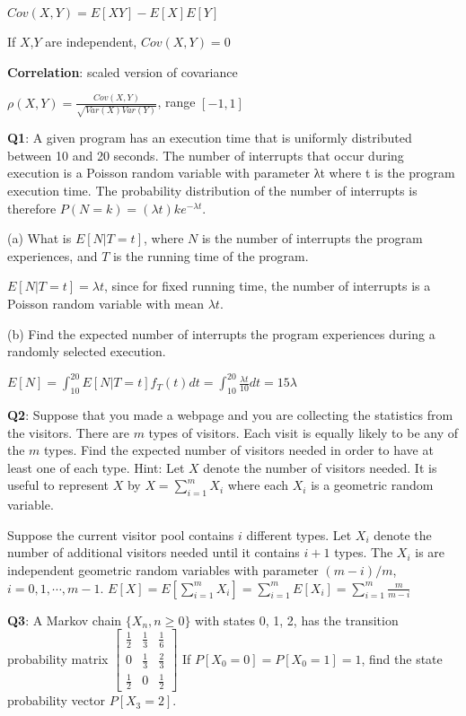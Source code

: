 \documentclass[10pt]{article}
\begin{document}
\begin{multicols*}{3}
$Cov(X,Y) = E[XY] - E[X]E[Y]$

If $X$,$Y$ are independent, $Cov(X,Y)=0$



{\bf Correlation}: scaled version of covariance

$\rho(X,Y)=\frac{Cov(X,Y)}{\sqrt{Var(X)Var(Y)}}$, range $[-1,1]$



{\bf Q1}: A given program has an execution time that is uniformly distributed between 10 and 20 seconds. The number of interrupts that occur during execution is a Poisson random variable with parameter λt where t is the program execution time. The probability distribution of the number of interrupts is therefore $P(N = k) = (\lambda t)ke^{−\lambda t}$.

(a) What is $E[N|T = t]$, where $N$ is the number of interrupts the program experiences, and $T$ is the running time of the program.

$E[N|T = t] = \lambda t$, since for fixed running time, the number of interrupts is a Poisson random variable with mean $\lambda t$.

(b) Find the expected number of interrupts the program experiences during a randomly
selected execution.

$E[N] = \int_{10}^{20} E[N|T=t]f_T(t)dt = \int_{10}^{20}\frac{\lambda t}{10}dt = 15\lambda$



{\bf Q2}: Suppose that you made a webpage and you are collecting the statistics from the visitors. There are $m$ types of visitors. Each visit is equally likely to be any of the $m$ types. Find the expected number of visitors needed in order to have at least one of each type. Hint: Let $X$ denote the number of visitors needed. It is useful to represent $X$ by $X=\sum_{i=1}^mX_i$ where each $X_i$ is a geometric random variable.

Suppose the current visitor pool contains $i$ different types. Let $X_i$ denote the number of additional visitors needed until it contains $i + 1$ types. The $X_i$ is are independent geometric random variables with parameter $(m - i)/m$, $i = 0, 1, \cdots, m-1$. $E[X]=E[\sum_{i=1}^mX_i]=\sum_{i=1}^mE[X_i]=\sum_{i=1}^m\frac{m}{m-i}$



{\bf Q3}: A Markov chain $\{X_n,n \geq 0\}$ with states 0, 1, 2, has the transition probability matrix $\begin{bmatrix}\frac{1}{2} & \frac{1}{3} & \frac{1}{6} \\ 0 & \frac{1}{3} & \frac{2}{3} \\ \frac{1}{2} & 0 & \frac{1}{2}\end{bmatrix}$ If $P[X_0 = 0] = P[X_0 = 1] = 1$, find the state probability vector $P[X_3 = 2]$.


\end{multicols*}
\end{document}
